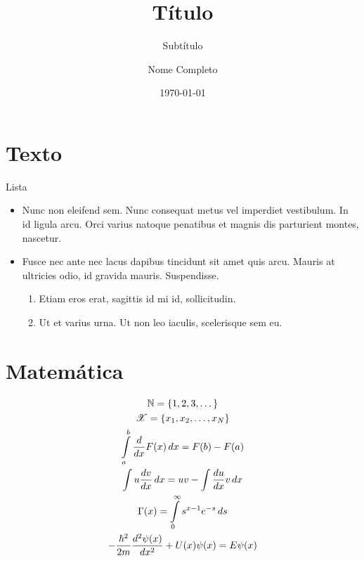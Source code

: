 \documentclass[red, ccm]{slideccm}
\title{Título}
\subtitle{Subtítulo}
\author{Nome Completo}
\institute{Instituto}
\date{\today}
\begin{document}
\frame{\titlepage}

\section{Texto}

\begin{frame}{Lista}
    \begin{itemize}
        \item Nunc non eleifend sem. Nunc consequat metus vel imperdiet vestibulum. In id ligula arcu. Orci varius natoque penatibus et magnis dis parturient montes, nascetur.
        \item Fusce nec ante nec lacus dapibus tincidunt sit amet quis arcu. Mauris at ultricies odio, id gravida mauris. Suspendisse.
        \begin{enumerate}
            \item Etiam eros erat, sagittis id mi id, sollicitudin.
            \item Ut et varius urna. Ut non leo iaculis, scelerisque sem eu.
        \end{enumerate}
    \end{itemize}
\end{frame}

\section{Matemática}

\begin{gather*}
    \mathbb{N} = \{ 1, 2, 3, \dots \} \\
    \mathscr{X} = \{ x_1, x_2, \dots, x_N \} \\
    \int\limits_a^b {\frac{d}{dx} F(x) \, dx}  = F(b) - F(a) \\
    \int u \frac{dv}{dx} \, dx = uv - \int \frac{du}{dx} v \, dx \\
    \Gamma(x) = \int\limits_0^\infty s^{x - 1} e^{-s} \, ds \\
    -\frac{\hbar^2}{2m}\frac{d^2 \psi(x)}{dx^2} + U(x)\psi (x) = E \psi(x)
\end{gather*}


\end{document}
